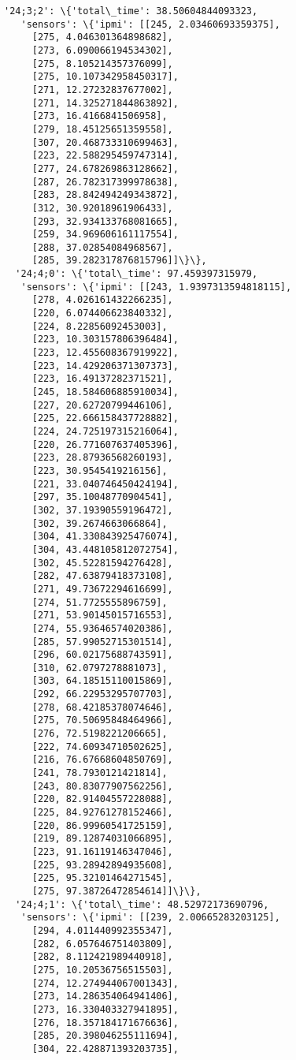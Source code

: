 \documentclass[11pt]{article}
\begin{document}
\begin{tcolorbox}[breakable, size=fbox, boxrule=.5pt, pad at break*=1mm, opacityfill=0]
\begin{Verbatim}[commandchars=\\\{\}]
  '24;3;2': \{'total\_time': 38.50604844093323,
   'sensors': \{'ipmi': [[245, 2.03460693359375],
     [275, 4.046301364898682],
     [273, 6.090066194534302],
     [275, 8.105214357376099],
     [275, 10.107342958450317],
     [271, 12.27232837677002],
     [271, 14.325271844863892],
     [273, 16.4166841506958],
     [279, 18.45125651359558],
     [307, 20.468733310699463],
     [223, 22.588295459747314],
     [277, 24.678269863128662],
     [287, 26.782317399978638],
     [283, 28.842494249343872],
     [312, 30.92018961906433],
     [293, 32.934133768081665],
     [259, 34.969606161117554],
     [288, 37.02854084968567],
     [285, 39.282317876815796]]\}\},
  '24;4;0': \{'total\_time': 97.459397315979,
   'sensors': \{'ipmi': [[243, 1.9397313594818115],
     [278, 4.026161432266235],
     [220, 6.074406623840332],
     [224, 8.22856092453003],
     [223, 10.303157806396484],
     [223, 12.455608367919922],
     [223, 14.429206371307373],
     [223, 16.49137282371521],
     [245, 18.584606885910034],
     [227, 20.62720799446106],
     [225, 22.666158437728882],
     [224, 24.725197315216064],
     [220, 26.771607637405396],
     [223, 28.87936568260193],
     [223, 30.9545419216156],
     [221, 33.040746450424194],
     [297, 35.10048770904541],
     [302, 37.19390559196472],
     [302, 39.2674663066864],
     [304, 41.330843925476074],
     [304, 43.448105812072754],
     [302, 45.52281594276428],
     [282, 47.63879418373108],
     [271, 49.73672294616699],
     [274, 51.7725555896759],
     [271, 53.90145015716553],
     [274, 55.93646574020386],
     [285, 57.99052715301514],
     [296, 60.02175688743591],
     [310, 62.0797278881073],
     [303, 64.18515110015869],
     [292, 66.22953295707703],
     [278, 68.42185378074646],
     [275, 70.50695848464966],
     [276, 72.5198221206665],
     [222, 74.60934710502625],
     [216, 76.67668604850769],
     [241, 78.7930121421814],
     [243, 80.83077907562256],
     [220, 82.91404557228088],
     [225, 84.92761278152466],
     [220, 86.99960541725159],
     [219, 89.12874031066895],
     [223, 91.16119146347046],
     [225, 93.28942894935608],
     [225, 95.32101464271545],
     [275, 97.38726472854614]]\}\},
  '24;4;1': \{'total\_time': 48.52972173690796,
   'sensors': \{'ipmi': [[239, 2.00665283203125],
     [294, 4.011440992355347],
     [282, 6.057646751403809],
     [282, 8.112421989440918],
     [275, 10.20536756515503],
     [274, 12.274944067001343],
     [273, 14.286354064941406],
     [273, 16.330403327941895],
     [276, 18.357184171676636],
     [285, 20.398046255111694],
     [304, 22.428871393203735],

\end{Verbatim}
\end{tcolorbox}
\end{document}
